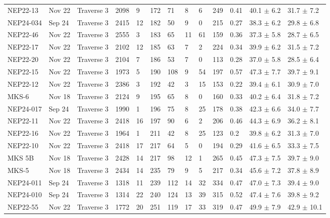 \begin{landscape}
{\begin{longtable}{l l l l l l l l l l l l l}
    NEP22-13 & Nov 22 & Traverse 3 & 2098 & 9 & 172 & 71 & 8 & 6 & 249 & 0.41 & 40.1 $\pm$ 6.2 & 31.7 $\pm$ 7.2 \\
    NEP24-034 & Sep 24 & Traverse 3 & 2415 & 12 & 182 & 50 & 9 & 0 & 215 & 0.27 & 38.3 $\pm$ 6.2 & 29.8 $\pm$ 6.8 \\
    NEP22-46 & Nov 22 & Traverse 3 & 2555 & 3 & 183 & 65 & 11 & 61 & 159 & 0.36 & 37.3 $\pm$ 5.8 & 28.7 $\pm$ 6.5 \\
    NEP22-17 & Nov 22 & Traverse 3 & 2102 & 12 & 185 & 63 & 7 & 2 & 224 & 0.34 & 39.9 $\pm$ 6.2 & 31.5 $\pm$ 7.2 \\
    NEP22-20 & Nov 22 & Traverse 3 & 2104 & 7 & 186 & 53 & 7 & 0 & 113 & 0.28 & 37.0 $\pm$ 5.8 & 28.5 $\pm$ 6.4 \\
    NEP22-15 & Nov 22 & Traverse 3 & 1973 & 5 & 190 & 108 & 9 & 54 & 197 & 0.57 & 47.3 $\pm$ 7.7 & 39.7 $\pm$ 9.1 \\
    NEP22-12 & Nov 22 & Traverse 3 & 2386 & 3 & 192 & 42 & 3 & 15 & 153 & 0.22 & 39.4 $\pm$ 6.1 & 30.9 $\pm$ 7.0 \\
    MKS-6 & Nov 18 & Traverse 3 & 2124 & 9 & 195 & 65 & 8 & 0 & 160 & 0.33 & 40.2 $\pm$ 6.4 & 31.8 $\pm$ 7.2 \\
    NEP24-017 & Sep 24 & Traverse 3 & 1990 & 1 & 196 & 75 & 8 & 25 & 178 & 0.38 & 42.3 $\pm$ 6.6 & 34.0 $\pm$ 7.7 \\
    NEP22-11 & Nov 22 & Traverse 3 & 2418 & 16 & 197 & 90 & 6 & 2 & 206 & 0.46 & 44.3 $\pm$ 6.9 & 36.2 $\pm$ 8.1 \\
    NEP22-16 & Nov 22 & Traverse 3 & 1964 & 1 & 211 & 42 & 8 & 25 & 123 & 0.2 & 39.8 $\pm$ 6.2 & 31.3 $\pm$ 7.0 \\
    NEP22-10 & Nov 22 & Traverse 3 & 2418 & 17 & 217 & 64 & 5 & 0 & 194 & 0.29 & 41.6 $\pm$ 6.5 & 33.3 $\pm$ 7.5 \\
    MKS 5B & Nov 18 & Traverse 3 & 2428 & 14 & 217 & 98 & 12 & 1 & 265 & 0.45 & 47.3 $\pm$ 7.5 & 39.7 $\pm$ 9.0 \\
    MKS-5 & Nov 18 & Traverse 3 & 2434 & 14 & 235 & 79 & 9 & 5 & 217 & 0.34 & 45.6 $\pm$ 7.2 & 37.8 $\pm$ 8.9 \\
    NEP24-011 & Sep 24 & Traverse 3 & 1318 & 11 & 239 & 112 & 14 & 32 & 334 & 0.47 & 47.0 $\pm$ 7.3 & 39.4 $\pm$ 9.0 \\
    NEP24-010 & Sep 24 & Traverse 3 & 1314 & 22 & 240 & 124 & 13 & 39 & 315 & 0.52 & 47.4 $\pm$ 7.6 & 39.8 $\pm$ 9.2 \\
    NEP22-55 & Nov 22 & Traverse 3 & 1772 & 20 & 251 & 119 & 17 & 33 & 319 & 0.47 & 49.9 $\pm$ 7.9 & 42.9 $\pm$ 10.1 \\

\end{longtable}}
\end{landscape}
